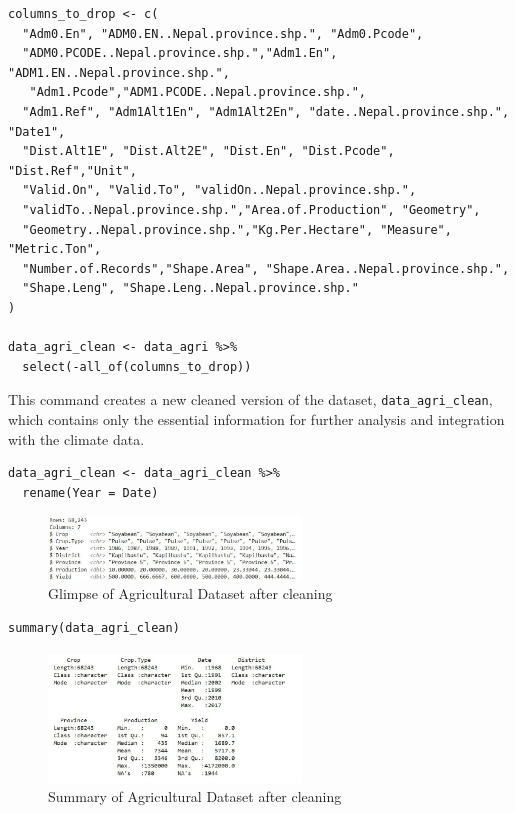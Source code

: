 \begin{verbatim}
columns_to_drop <- c(
  "Adm0.En", "ADM0.EN..Nepal.province.shp.", "Adm0.Pcode",
  "ADM0.PCODE..Nepal.province.shp.","Adm1.En", "ADM1.EN..Nepal.province.shp.",
   "Adm1.Pcode","ADM1.PCODE..Nepal.province.shp.",
  "Adm1.Ref", "Adm1Alt1En", "Adm1Alt2En", "date..Nepal.province.shp.", "Date1",
  "Dist.Alt1E", "Dist.Alt2E", "Dist.En", "Dist.Pcode", "Dist.Ref","Unit", 
  "Valid.On", "Valid.To", "validOn..Nepal.province.shp.", 
  "validTo..Nepal.province.shp.","Area.of.Production", "Geometry", 
  "Geometry..Nepal.province.shp.","Kg.Per.Hectare", "Measure", "Metric.Ton", 
  "Number.of.Records","Shape.Area", "Shape.Area..Nepal.province.shp.", 
  "Shape.Leng", "Shape.Leng..Nepal.province.shp."
)

data_agri_clean <- data_agri %>%
  select(-all_of(columns_to_drop))
\end{verbatim}

This command creates a new cleaned version of the dataset, \texttt{data\_agri\_clean}, which contains only the essential information for further analysis and integration with the climate data.

\begin{verbatim}
data_agri_clean <- data_agri_clean %>%
  rename(Year = Date)
\end{verbatim}
\clearpage
\begin{figure}[h]
\centering
\includegraphics[width=0.6\textwidth]{figures/cleaned_agri.jpg}
\caption{ Glimpse of Agricultural Dataset after cleaning}
\end{figure}

\begin{verbatim}
summary(data_agri_clean)
\end{verbatim}

\begin{figure}[h]
\centering
\includegraphics[width=0.6\textwidth]{figures/summary_agri.jpg}
\caption{ Summary of Agricultural Dataset after cleaning}
\end{figure}

